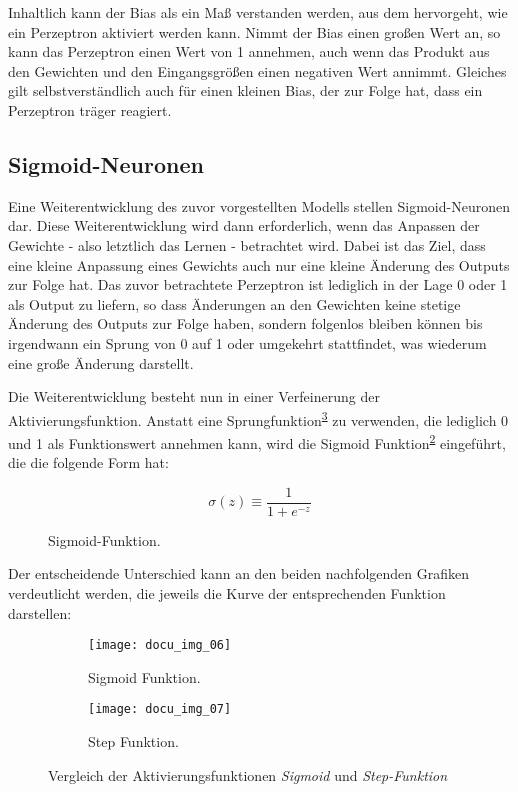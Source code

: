 Inhaltlich kann der Bias als ein Maß verstanden werden, aus dem hervorgeht, wie  ein Perzeptron aktiviert
werden kann. Nimmt der Bias einen großen Wert an, so kann das Perzeptron einen Wert von 1 annehmen, auch wenn das
Produkt aus den Gewichten und den Eingangsgrößen einen negativen Wert annimmt. Gleiches gilt selbstverständlich auch für
einen kleinen Bias, der zur Folge hat, dass ein Perzeptron träger reagiert.

\subsection{Sigmoid-Neuronen}

Eine Weiterentwicklung des zuvor vorgestellten Modells stellen Sigmoid-Neuronen dar. Diese Weiterentwicklung wird
dann erforderlich, wenn das Anpassen der Gewichte - also letztlich das Lernen - betrachtet wird. Dabei ist das Ziel,
dass eine kleine Anpassung eines Gewichts auch nur eine kleine Änderung des Outputs zur Folge hat. Das zuvor
betrachtete Perzeptron ist lediglich in der Lage 0 oder 1 als Output zu liefern, so dass Änderungen an den Gewichten
keine stetige Änderung des Outputs zur Folge haben, sondern folgenlos bleiben können bis irgendwann ein Sprung von 0
auf 1 oder umgekehrt stattfindet, was wiederum eine große Änderung darstellt.

Die Weiterentwicklung besteht nun in einer Verfeinerung der Aktivierungsfunktion. Anstatt eine Sprungfunktion\textsuperscript{\ref{fig:step-function}} zu
verwenden, die lediglich 0 und 1 als Funktionswert annehmen kann, wird die Sigmoid Funktion\textsuperscript{\ref{fig:sigmoid-function}} eingeführt,
die die folgende Form hat:

\begin{figure}[h]
    \centering
    \[ \sigma(z) \equiv
          \frac{1}{1+e^{-z}}
    \]
    \caption{Sigmoid-Funktion.}
    \label{fig:sigmoid}
\end{figure}

Der entscheidende Unterschied kann an den beiden nachfolgenden Grafiken verdeutlicht werden, die jeweils die Kurve
der entsprechenden Funktion darstellen:

\captionsetup[subfigure]{labelformat=empty, labelsep=none}
\begin{figure}[h]
    \centering
    \begin{subfigure}{0.45\textwidth}
		\texttt{[image: docu\_img\_06]}
		\caption{\tiny{Sigmoid Funktion.}}
		\label{fig:sigmoid-function}
	\end{subfigure}
    \begin{subfigure}{0.45\textwidth}
		\texttt{[image: docu\_img\_07]}
		\caption{\tiny{Step Funktion.}}
		\label{fig:step-function}
	\end{subfigure}

    \caption{Vergleich der Aktivierungsfunktionen \textit{Sigmoid} und \textit{Step-Funktion}}
    \label{fig:activation-functions}
\end{figure}

